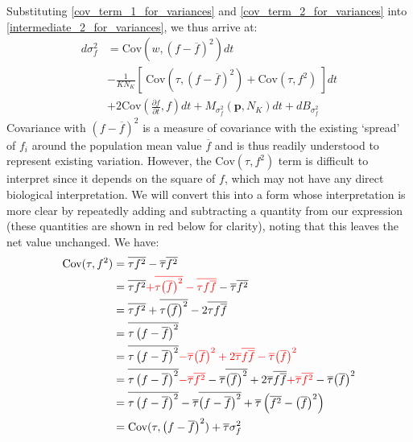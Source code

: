 Substituting \eqref{cov_term_1_for_variances} and \eqref{cov_term_2_for_variances} into \eqref{intermediate_2_for_variances}, we thus arrive at:
\begin{equation}
\label{intermediate_3_for_variances}
\begin{aligned}
d\sigma^2_{f} &= \textrm{Cov}\left(w,(f - \overline{f})^2\right)dt\\
&- \frac{1}{KN_K}\left[ \ \textrm{Cov}\left(\tau,(f - \overline{f})^2\right) + \textrm{Cov}(\tau,f^2) \ \right]dt\\
& + 2\textrm{Cov}\left(\frac{\partial f}{\partial t},f\right)dt + M_{\sigma^2_f}(\mathbf{p},N_K)dt + dB_{\sigma^2_{f}}
\end{aligned}
\end{equation}
Covariance with $(f-\overline{f})^2$ is a measure of covariance with the existing `spread' of $f_i$ around the population mean value $\overline{f}$ and is thus readily understood to represent existing variation. However, the $\textrm{Cov}(\tau,f^2)$ term is difficult to interpret since it depends on the square of $f$, which may not have any direct biological interpretation. We will convert this into a form whose interpretation is more clear by repeatedly adding and subtracting a quantity from our expression (these quantities are shown in red below for clarity), noting that this leaves the net value unchanged. We have:
\begin{align}
\textrm{Cov}(\tau, f^2) &= \overline{\tau f^2} - \overline{\tau}\overline{f^2}\nonumber\\
&= \overline{\tau f^2} {\color{red} + \overline{\tau{\left(\overline{f}\right)}^2} - \overline{\tau f \overline{f}}}  - \overline{\tau}\overline{f^2} \nonumber\\
&= \overline{\tau f^2} + \overline{\tau{\left(\overline{f}\right)}^2} - 2\overline{\tau f \overline{f}}\nonumber\\
&= \overline{\tau\left(f-\overline{f}\right)^2}\nonumber\\
&= \overline{\tau\left(f-\overline{f}\right)^2} {\color{red}- \overline{\tau}{\left(\overline{f}\right)}^2 + 2 \overline{\tau}\overline{f\overline{f}} - \overline{\tau}{\left(\overline{f}\right)}^2}\nonumber\\
&= \overline{\tau\left(f-\overline{f}\right)^2} {\color{red} - \overline{\tau}\overline{f^2}} -\overline{\tau}\overline{{\left(\overline{f}\right)}^2} + 2 \overline{\tau}\overline{f\overline{f}} {\color{red} + \overline{\tau}\overline{f^2}} - \overline{\tau}{\left(\overline{f}\right)}^2\nonumber\\
&=  \overline{\tau\left(f-\overline{f}\right)^2} - \overline{\tau}\overline{\left(f-\overline{f}\right)^2} + \overline{\tau}\left(\overline{f^2} - {\left(\overline{f}\right)}^2\right)\nonumber\\
&= \textrm{Cov}(\tau, \left(f-\overline{f}\right)^2) + \overline{\tau}\sigma^2_{f}\label{cov_to_var_sub_for_variances}
\end{align}
